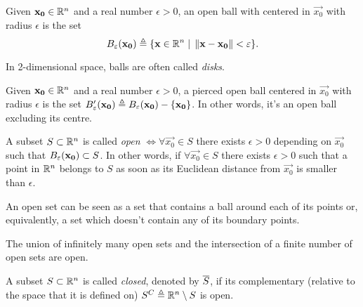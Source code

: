 \begin{defn}
Given $\vec{x_0}\in\Rtn$ and a real number $\epsilon > 0$, an open ball with centered in $\vec{x_0}$ with radius $\epsilon$ is the set
\begin{equation}
B_\epsilon\argopen(\vec{x_0}\argclose)\bydef\{\vec{x}\in\Rtn\st\vnorm{\vec{x} - \vec{x_0}} < \epsilon\}.
\end{equation}
\end{defn}

\begin{note}
	In 2-dimensional space, balls are often called \textit{disks}.
\end{note}

\begin{defn}
Given $\vec{x_0}\in\Rtn$ and a real number $\epsilon > 0$, a pierced open ball centered in $\vec{x_0}$ with radius $\epsilon$ is the
set $B'_\epsilon\argopen(\vec{x_0}\argclose)\bydef B_\epsilon\argopen(\vec{x_0}\argclose) - \{\vec{x_0}\}$. In other words, it's an 
open ball excluding its centre.
\end{defn}

\begin{defn}
	A subset $S\subset\Rtn$ is called \textit{open} $\iff\forall\vec{x_0}\in S$ there exists $\epsilon > 0$ depending on $\vec{x_0}$ such that $B_\epsilon\argopen(\vec{x_0}\argclose)\subset S$. In other words, if $\forall\vec{x_0}\in S$ there exists $\epsilon > 0$
	such that a point in $\Rtn$ belongs to $S$ as soon as its Euclidean distance from $\vec{x_0}$ is smaller than $\epsilon$. 
\end{defn}

\begin{note}
An open set can be seen as a set that contains a ball around each of its points or, equivalently, a set which doesn't contain any of
its boundary points.
\end{note}

\begin{prop}
The union of infinitely many open sets and the intersection of a finite number of open sets are open.
\end{prop}

\begin{defn}
	A subset $S\subset\Rtn$ is called \textit{closed}, denoted by $\overline{S}$, if its complementary (relative to the space that it is defined on) $S^C \bydef\Rtn\setminus S$ is open. 
\end{defn}

